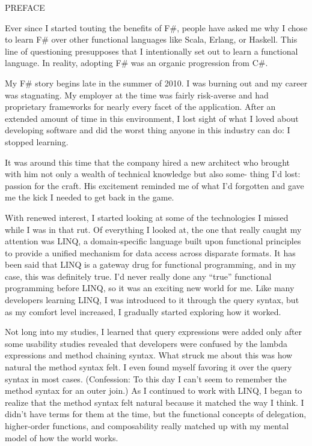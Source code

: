 \documentclass{book}
\begin{document}
PREFACE

Ever since I started touting the benefits of F\#, people have asked me why I chose to learn F\# over other functional languages like Scala, Erlang, or Haskell. This line of questioning presupposes that I intentionally set out to learn a functional language. In reality, adopting F\# was an organic progression from C\#.

My F\# story begins late in the summer of 2010. I was burning out and my career was stagnating. My employer at the time was fairly risk-averse and had proprietary frameworks for nearly every facet of the application. After an extended amount of time in this environment, I lost sight of what I loved about developing software and did the worst thing anyone in this industry can do: I stopped learning.

It was around this time that the company hired a new architect who brought with him not only a wealth of technical knowledge but also some- thing I’d lost: passion for the craft. His excitement reminded me of what I’d forgotten and gave me the kick I needed to get back in the game.

With renewed interest, I started looking at some of the technologies I missed while I was in that rut. Of everything I looked at, the one that really caught my attention was LINQ, a domain-specific language built upon functional principles to provide a unified mechanism for data access across disparate formats. It has been said that LINQ is a gateway drug for functional programming, and in my case, this was definitely true. I’d never really done any “true” functional programming before LINQ, so it was an exciting new world for me. Like many developers learning LINQ, I was introduced to it through the query syntax, but as my comfort level increased, I gradually started exploring how it worked.

Not long into my studies, I learned that query expressions were added only after some usability studies revealed that developers were confused by the lambda expressions and method chaining syntax. What struck me about this was how natural the method syntax felt. I even found myself favoring it over the query syntax in most cases. (Confession: To this day I can’t seem to remember the method syntax for an outer join.) As I continued to work with LINQ, I began to realize that the method syntax felt natural because it matched the way I think. I didn’t have terms for them at the time, but the functional concepts of delegation, higher-order functions, and composability really matched up with my mental model of how the world works.
\end{document}
